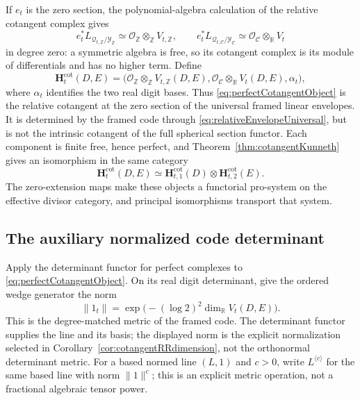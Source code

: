 \documentclass[11pt]{amsart}
\theoremstyle{definition}
\theoremstyle{remark}
\newcommand{\R}{\mathbb R}
\newcommand{\Z}{\mathbb Z}
\begin{document}
If $e_t$ is the zero section, the polynomial-algebra calculation of the
relative cotangent complex gives
\[
 e_t^*L_{\mathcal Q_{t,\Z}/\mathscr Y_{\Z}}
   \simeq\mathcal O_{\Z}\otimes_{\Z}V_{t,\Z},\qquad
 e_t^*L_{\mathcal Q_{t,\mathcal C}/\mathscr Y_{\mathcal C}}
   \simeq\mathcal O_{\mathcal C}\otimes_{\R}V_t
\]
in degree zero: a symmetric algebra is free, so its cotangent complex is its
module of differentials and has no higher term.  Define
\begin{equation}\label{eq:perfectCotangentObject}
 \mathbf H_t^{\mathrm{cot}}(D,E)=
 \bigl(
 \mathcal O_{\Z}\otimes_{\Z}V_{t,\Z}(D,E),
 \mathcal O_{\mathcal C}\otimes_{\R}V_t(D,E),
 \alpha_t
 \bigr),
\end{equation}
where $\alpha_t$ identifies the two real digit bases.  Thus
\eqref{eq:perfectCotangentObject} is the relative cotangent at the zero
section of the universal framed linear envelopes.  It is determined by the
framed code through \eqref{eq:relativeEnvelopeUniversal}, but is not the
intrinsic cotangent of the full spherical section functor.  Each component
is finite free, hence perfect, and
Theorem~\ref{thm:cotangentKunneth} gives an isomorphism in the same category
\begin{equation}\label{eq:perfectKunneth}
 \mathbf H_t^{\mathrm{cot}}(D,E)
 \simeq\mathbf H_{t,1}^{\mathrm{cot}}(D)
 \otimes\mathbf H_{t,2}^{\mathrm{cot}}(E).
\end{equation}
The zero-extension maps make these objects a functorial pro-system on the
effective divisor category, and principal isomorphisms transport that
system.

\subsection{The auxiliary normalized code determinant}

Apply the determinant functor for perfect complexes
\cite{KnudsenMumford} to
\eqref{eq:perfectCotangentObject}.  On its real digit determinant, give the
ordered wedge generator the norm
\begin{equation}\label{eq:finiteRRmetric}
 \|1_t\|=\exp\bigl(- (\log2)^2\dim_{\R}V_t(D,E)\bigr).
\end{equation}
This is the degree-matched metric of the framed code.  The determinant
functor supplies the line and its basis; the displayed norm is the explicit
normalization selected in Corollary~\ref{cor:cotangentRRdimension}, not the
orthonormal determinant metric.
For a based normed line $(L,1)$ and $c>0$, write $L^{\langle c\rangle}$ for
the same based line with norm $\|1\|^c$; this is an explicit metric
operation, not a fractional algebraic tensor power.
\end{document}
